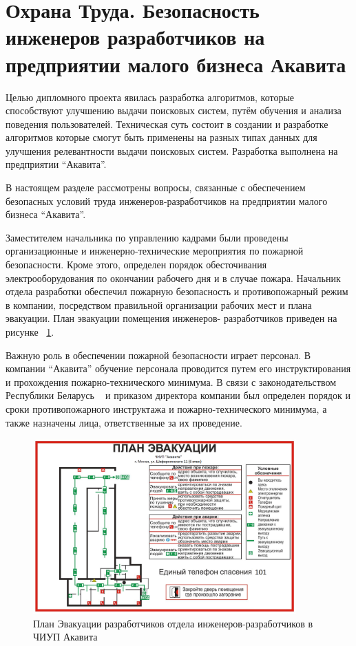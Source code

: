 \section{Охрана Труда. Безопасность инженеров разработчиков на предприятии малого бизнеса Акавита}

Целью дипломного проекта явилась разработка алгоритмов, которые способствуют улучшению выдачи поисковых систем, путём обучения и анализа поведения пользователей. Техническая суть состоит в создании и разработке алгоритмов которые смогут быть применены на разных типах данных для улучшения релевантности выдачи поисковых систем. Разработка выполнена на предприятии “Акавита”.

В настоящем разделе рассмотрены вопросы, связанные с обеспечением безопасных условий труда инженеров-разработчиков на предприятии малого бизнеса “Акавита”.

Заместителем начальника по управлению кадрами были проведены организационные и инженерно-технические мероприятия по пожарной безопасности. Кроме этого, определен порядок обесточивания электрооборудования по окончании рабочего дня и в случае пожара. Начальник отдела разработки обеспечил пожарную безопасность и противопожарный режим в компании, посредством правильной организации рабочих мест и плана эвакуации. План эвакуации помещения инженеров- 	разработчиков приведен на рисунке ~\ref{evacuation_plan}.

Важную роль в обеспечении пожарной безопасности играет персонал. В компании “Акавита” обучение персонала проводится путем его инструктирования и прохождения пожарно-технического минимума. В связи с законодательством Республики Беларусь ~\cite{ot_1} и приказом директора компании был определен порядок и сроки противопожарного инструктажа и пожарно-технического минимума, а также назначены лица, ответственные за
их проведение. 

\begin{figure}
  \centering
  \includegraphics[width=0.9\textwidth]{images/evacuation_plan.png}
  \caption{План Эвакуации разработчиков отдела инженеров-разработчиков в ЧИУП Акавита\label{evacuation_plan}}
\end{figure}

